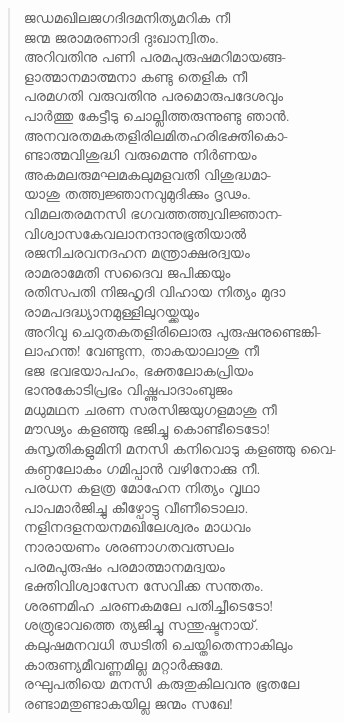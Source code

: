 \begin{verse}
ജഡമഖിലജഗദിദമനിത്യമറിക നീ\\
ജന്മ ജരാമരണാദി ദുഃഖാന്വിതം.\\
അറിവതിനു പണി പരമപുരുഷമറിമായങ്ങ-\\
ളാത്മാനമാത്മനാ കണ്ടു തെളിക നീ\\
പരമഗതി വരുവതിനു പരമൊരുപദേശവും\\
പാര്‍ത്തു കേട്ടീടു ചൊല്ലിത്തരുന്നുണ്ടു ഞാന്‍.\\
അനവരതമകതളിരിലമിതഹരിഭക്തികൊ-\\
ണ്ടാത്മവിശുദ്ധി വരുമെന്നു നിര്‍ണയം\\
അകമലരുമഘമകലുമളവതി വിശുദ്ധമാ-\\
യാശു തത്ത്വജ്ഞാനവുമുദിക്കും ദൃഢം.\\
വിമലതരമനസി ഭഗവത്തത്ത്വവിജ്ഞാന-\\
വിശ്വാസകേവലാനന്ദാനുഭൂതിയാല്‍\\
രജനിചരവനദഹന മന്ത്രാക്ഷരദ്വയം\\
രാമരാമേതി സദൈവ ജപിക്കയും\\
രതിസപതി നിജഹൃദി വിഹായ നിത്യം മുദാ\\
രാമപദദ്ധ്യാനമുള്ളിലുറയ്ക്കയും\\
അറിവു ചെറുതകതളിരിലൊരു പുരുഷനുണ്ടെങ്കി-\\
ലാഹന്ത! വേണ്ടുന്ന, താകയാലാശു നീ\\
ഭജ ഭവഭയാപഹം, ഭക്തലോകപ്രിയം\\
ഭാനുകോടിപ്രഭം വിഷ്ണുപാദാംബുജം\\
മധുമഥന ചരണ സരസിജയുഗളമാശു നീ\\
മൗഢ്യം കളഞ്ഞു ഭജിച്ചു കൊണ്ടീടെടോ!\\
കുസൃതികളുമിനി മനസി കനിവൊടു കളഞ്ഞു വൈ-\\
കുണ്ഠലോകം ഗമിപ്പാന്‍ വഴിനോക്കു നീ.\\
പരധന കളത്ര മോഹേന നിത്യം വൃഥാ\\
പാപമാര്‍ജിച്ചു കീഴ്പോട്ടു വീണീടൊലാ.\\
നളിനദളനയനമഖിലേശ്വരം മാധവം\\
നാരായണം ശരണാഗതവത്സലം\\
പരമപുരുഷം പരമാത്മാനമദ്വയം\\
ഭക്തിവിശ്വാസേന സേവിക്ക സന്തതം.\\
ശരണമിഹ ചരണകമലേ പതിച്ചീടെടോ!\\
ശത്രുഭാവത്തെ ത്യജിച്ചു സന്തുഷ്ടനായ്.\\
കലുഷമനവധി ഝടിതി ചെയ്തിതെന്നാകിലും\\
കാരുണ്യമീവണ്ണമില്ല മറ്റാര്‍ക്കുമേ.\\
രഘുപതിയെ മനസി കരുതുകിലവനു ഭൂതലേ\\
രണ്ടാമതുണ്ടാകയില്ല ജന്മം സഖേ!\\

\end{verse}
